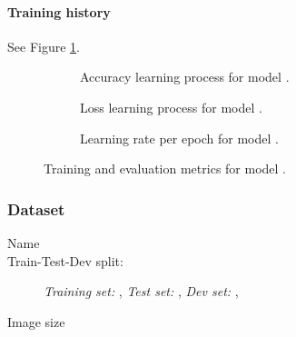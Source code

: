 \documentclass[10pt]{article}
\begin{document}
    \paragraph*{Training history} See Figure \ref{fig:results\VAR{summary['model']['reportnumber']}}.
    \begin{figure}[H]
        \centering
        \begin{subfigure}{.5\textwidth}
            \caption{Accuracy learning process for model \protect\hyperref[training:\VAR{summary['model']['reportnumber']}]
                        {}.}
        \end{subfigure}%
        \hfill%
        \begin{subfigure}{.5\textwidth}
            \caption{Loss learning process for model \protect\hyperref[training:\VAR{summary['model']['reportnumber']}]
                        {}.}
        \end{subfigure}
        \par\bigskip
        \begin{subfigure}{.5\textwidth}
            \caption{Learning rate per epoch for model \protect\hyperref[training:\VAR{summary['model']['reportnumber']}]
                        {}.}
        \end{subfigure}%
        \caption{Training and evaluation metrics for model  \protect\hyperref[training:\VAR{summary['model']['reportnumber']}]
                    {}.
                \label{fig:results\VAR{summary['model']['reportnumber']}}}
    \end{figure}

    \subsubsection*{Dataset}
    \begin{description}
        \item[Name] 
        \item[Train-Test-Dev split:] {\it Training set:}
        ,
        {\it Test set:}
        ,
        {\it Dev set:}
        ,
        \item[Image size] 
    \end{description}
\end{document}
